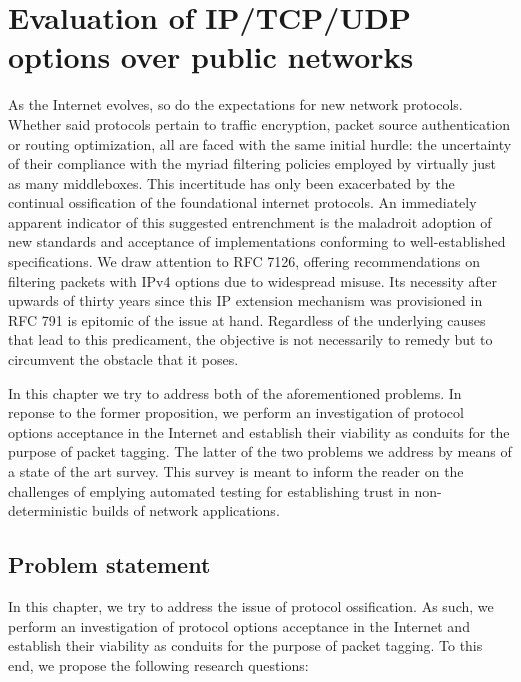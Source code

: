 \chapter{Evaluation of IP/TCP/UDP options over public networks}

As the Internet evolves, so do the expectations for new network protocols. Whether said protocols pertain to traffic encryption, packet source authentication or routing optimization, all are faced with the same initial hurdle: the uncertainty of their compliance with the myriad filtering policies employed by virtually just as many middleboxes. This incertitude has only been exacerbated by the continual ossification of the foundational internet protocols. An immediately apparent indicator of this suggested entrenchment is the maladroit adoption of new standards and acceptance of implementations conforming to well-established specifications. We draw attention to RFC 7126, offering recommendations on filtering packets with IPv4 options due to widespread misuse. Its necessity after upwards of thirty years since this IP extension mechanism was provisioned in RFC 791 is epitomic of the issue at hand. Regardless of the underlying causes that lead to this predicament, the objective is not necessarily to remedy but to circumvent the obstacle that it poses.

In this chapter we try to address both of the aforementioned problems. In reponse to the former proposition, we perform an investigation of protocol options acceptance in the Internet and establish their viability as conduits for the purpose of packet tagging. The latter of the two problems we address by means of a state of the art survey. This survey is meant to inform the reader on the challenges of emplying automated testing for establishing trust in non-deterministic builds of network applications.

\section{Problem statement}

In this chapter, we try to address the issue of protocol ossification. As such,
we perform an investigation of protocol options acceptance in the Internet and
establish their viability as conduits for the purpose of packet tagging. To this
end, we propose the following research questions:

